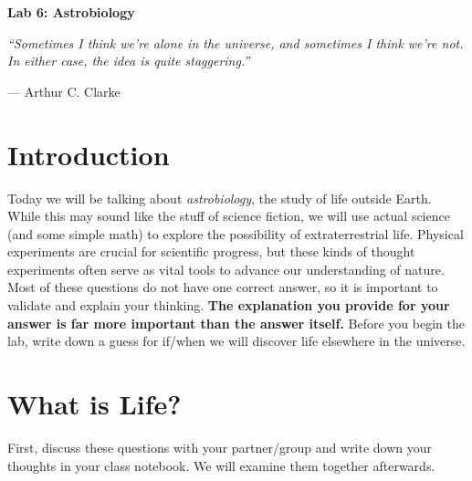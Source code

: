 \documentclass[12pt]{article}
\begin{document}
\setlength{\parskip}{8pt plus2pt minus2pt}

\begin{center}

\Large\textbf{Lab 6: Astrobiology}
\end{center}

\vspace{10 pt}


\begin{center}
\textit{\large``Sometimes I think we're alone in the universe, and sometimes I think we're not. In either case, the idea is quite staggering.''}

\large--- Arthur C. Clarke
\end{center} 


\section{Introduction}

Today we will be talking about \emph{astrobiology}, the study of life outside Earth. While this may sound like the stuff of science fiction, we will use actual science (and some simple math) to explore the possibility of extraterrestrial life. Physical experiments are crucial for scientific progress, but these kinds of thought experiments often serve as vital tools to advance our understanding of nature. Most of these questions do not have one correct answer, so it is important to validate and explain your thinking. \textbf{The explanation you provide for your answer is far more important than the answer itself.} Before you begin the lab, write down a guess for if/when we will discover life elsewhere in the universe. 


\section{What is Life?}

First, discuss these questions with your partner/group and write down your thoughts in your class notebook. We will examine them together afterwards. 
\end{document}
